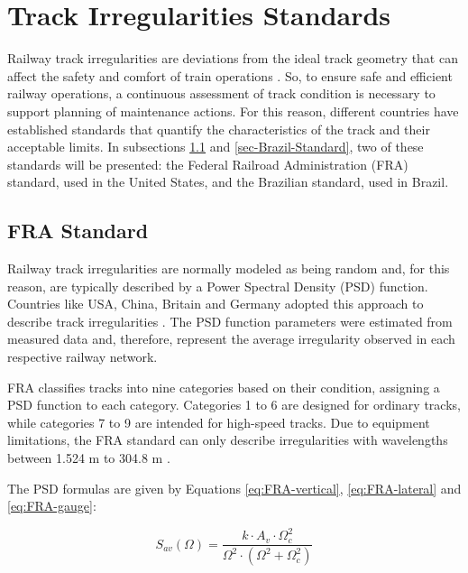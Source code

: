 \section{Track Irregularities Standards} \label{sec-track-defects}

Railway track irregularities are deviations from the ideal track geometry that can affect the safety and comfort of train operations \cite{Sansinena26032025}. So, to ensure safe and efficient railway operations, a continuous assessment of track condition is necessary to support planning of maintenance actions. For this reason, different countries have established standards that quantify the characteristics of the track and their acceptable limits. In subsections \ref{sec-FRA-Standard} and \ref{sec-Brazil-Standard}, two of these standards will be presented: the Federal Railroad Administration (FRA) standard, used in the United States, and the Brazilian standard, used in Brazil.

\subsection{FRA Standard} \label{sec-FRA-Standard}

Railway track irregularities are normally modeled as being random and, for this reason, are typically described by a Power Spectral Density (PSD) function. Countries like USA, China, Britain and Germany adopted this approach to describe track irregularities \cite{PIRES2021107806,Berawi2013ImprovingRT}. The PSD function parameters were estimated from measured data and, therefore, represent the average irregularity observed in each respective railway network.

FRA classifies tracks into nine categories based on their condition, assigning a PSD function to each category. Categories 1 to 6 are designed for ordinary tracks, while categories 7 to 9 are intended for high-speed tracks. Due to equipment limitations, the FRA standard can only describe irregularities with wavelengths between 1.524 m to 304.8 m \cite{Berawi2013ImprovingRT}.

The PSD formulas are given by Equations \ref{eq:FRA-vertical}, \ref{eq:FRA-lateral} and \ref{eq:FRA-gauge}:

\begin{equation}
    S_{av}(\Omega) = \frac{k \cdot A_v \cdot \Omega_c^2}{\Omega^2 \cdot \left(\Omega^2 + \Omega_c^2\right)}
    \label{eq:FRA-vertical}
\end{equation}

